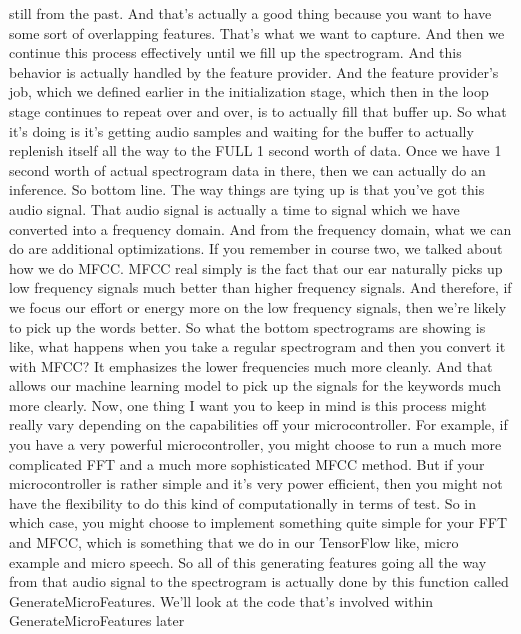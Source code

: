    still from the past.
    And that's actually a good thing because you
    want to have some sort of overlapping features.
    That's what we want to capture.
    And then we continue this process effectively
    until we fill up the spectrogram.
    And this behavior is actually handled by the feature provider.
    And the feature provider's job, which we defined earlier in the initialization
    stage, which then in the loop stage continues to repeat over and over,
    is to actually fill that buffer up.
    So what it's doing is it's getting audio samples and waiting for the buffer
    to actually replenish itself all the way to the FULL 1 second worth of data.
    Once we have 1 second worth of actual spectrogram data in there,
    then we can actually do an inference.
    So bottom line.
    The way things are tying up is that you've got this audio signal.
    That audio signal is actually a time to signal which we
    have converted into a frequency domain.
    And from the frequency domain, what we can do are additional optimizations.
    If you remember in course two, we talked about how we do MFCC.
    MFCC real simply is the fact that our ear naturally
    picks up low frequency signals much better than higher frequency signals.
    And therefore, if we focus our effort or energy
    more on the low frequency signals, then we're
    likely to pick up the words better.
    So what the bottom spectrograms are showing is like,
    what happens when you take a regular spectrogram
    and then you convert it with MFCC?
    It emphasizes the lower frequencies much more cleanly.
    And that allows our machine learning model
    to pick up the signals for the keywords much more clearly.
    Now, one thing I want you to keep in mind
    is this process might really vary depending
    on the capabilities off your microcontroller.
    For example, if you have a very powerful microcontroller,
    you might choose to run a much more complicated FFT and a much more
    sophisticated MFCC method.
    But if your microcontroller is rather simple and it's very power efficient,
    then you might not have the flexibility to do this kind of computationally
    in terms of test.
    So in which case, you might choose to implement something
    quite simple for your FFT and MFCC, which
    is something that we do in our TensorFlow like, micro example
    and micro speech.
    So all of this generating features going all the way
    from that audio signal to the spectrogram
    is actually done by this function called GenerateMicroFeatures.
    We'll look at the code that's involved within GenerateMicroFeatures later
